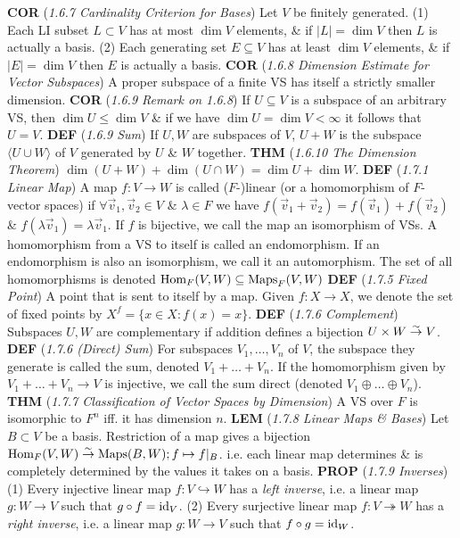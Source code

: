 \documentclass{article}
\newcommand{\wde}[1]{\textcolor{defc}{\textbf{DEF}} (\textcolor{namec}{\textit{#1}})}
\newcommand{\wl}[1]{\textcolor{lemc}{\textbf{LEM}} (\textcolor{namec}{\textit{#1}})}
\newcommand{\wc}[1]{\textcolor{corc}{\textbf{COR}} (\textcolor{namec}{\textit{#1}})}
\newcommand{\wpr}[1]{\textcolor{propc}{\textbf{PROP}} (\textcolor{namec}{\textit{#1}})}
\newcommand{\wt}[1]{\textcolor{thmc}{\textbf{THM}} (\textcolor{namec}{\textit{#1}})}
\begin{document}
\begin{multicols}{2}
  \wc{1.6.7 Cardinality Criterion for Bases} Let $V$ be finitely generated.
  (1) Each LI subset $L \subset V$ has at most $\dim V$ elements, \& if $|L| = \dim V$ then $L$ is actually a basis.
  (2) Each generating set $E \subseteq V$ has at least $\dim V$ elements, \& if $|E| = \dim V$ then $E$ is actually a basis.
  \wc{1.6.8 Dimension Estimate for Vector Subspaces} A proper subspace of a finite VS has itself a strictly smaller dimension.
  \wc{1.6.9 Remark on 1.6.8} If $U \subseteq V$ is a subspace of an arbitrary VS, then $\dim U \le \dim V$ \& if we have $\dim U = \dim V < \infty$ it follows that $U = V$.
  \wde{1.6.9 Sum} If $U,W$ are subspaces of $V$, $U + W$ is the subspace $\langle U \cup W \rangle$ of $V$ generated by $U$ \& $W$ together.
  \wt{1.6.10 The Dimension Theorem} $\dim(U + W) + \dim(U \cap W) = \dim U + \dim W$.
  \wde{1.7.1 Linear Map} A map $f : V \to W$ is called ($F$-)linear (or a homomorphism of $F$-vector spaces) if $\forall \vec{v}_{1}, \vec{v}_{2} \in V$ \& $\lambda \in F$ we have $f(\vec{v}_{1} + \vec{v}_{2}) = f(\vec{v}_{1}) + f(\vec{v}_{2})$ \& $f(\lambda \vec{v}_{1}) = \lambda \vec{v}_{1}$. If $f$ is bijective, we call the map an isomorphism of VSs. A homomorphism from a VS to itself is called an endomorphism. If an endomorphism is also an isomorphism, we call it an automorphism. The set of all homomorphisms is denoted $\text{Hom}_{F}(V,W) \subseteq \text{Maps}_{F}(V,W)$
  \wde{1.7.5 Fixed Point} A point that is sent to itself by a map. Given $f : X \to X$, we denote the set of fixed points by $X^{f} = \{x \in X : f(x) = x\}$.
  \wde{1.7.6 Complement} Subspaces $U,W$ are complementary if addition defines a bijection $U \times W \stackrel{\sim}{\to} V$.
  \wde{1.7.6 (Direct) Sum} For subspaces $V_{1}, \dots, V_{n}$ of $V$, the subspace they generate is called the sum, denoted $V_{1} + \dots + V_{n}$. If the homomorphism given by $V_{1} + \dots + V_{n} \to V$ is injective, we call the sum direct (denoted $V_{1} \oplus \dots \oplus V_{n}$).
  \wt{1.7.7 Classification of Vector Spaces by Dimension} A VS over $F$ is isomorphic to $F^{n}$ iff. it has dimension $n$.
  \wl{1.7.8 Linear Maps \& Bases} Let $B \subset V$ be a basis. Restriction of a map gives a bijection $\text{Hom}_{F}(V, W) \stackrel{\sim}{\to} \text{Maps}(B, W); f \mapsto f |_{B}$. i.e. each linear map determines \& is completely determined by the values it takes on a basis.
  \wpr{1.7.9 Inverses}
  (1) Every injective linear map $f : V \hookrightarrow W$ has a \emph{left inverse}, i.e. a linear map $g : W \to V$ such that $g \circ f = \text{id}_{V}$.
  (2) Every surjective linear map $f : V \twoheadrightarrow W$ has a \emph{right inverse}, i.e. a linear map $g : W \to V$ such that $f \circ g = \text{id}_{W}$.

\end{multicols}
\end{document}
